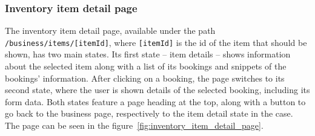 \subsubsection{Inventory item detail page}

\begin{sloppypar}
The inventory item detail page, available under the path \texttt{/business/items/[itemId]}, where \texttt{[itemId]} is the id of the item that should be shown, has two main states. Its first state -- item details -- shows information about the selected item along with a list of its bookings and snippets of the bookings' information. After clicking on a booking, the page switches to its second state, where the user is shown details of the selected booking, including its form data. Both states feature a page heading at the top, along with a button to go back to the business page, respectively to the item detail state in the case. The page can be seen in the figure~\ref{fig:inventory_item_detail_page}.
\end{sloppypar}

